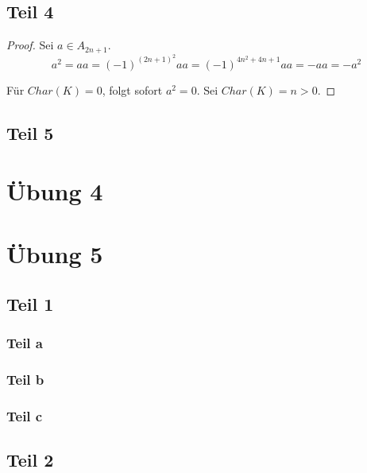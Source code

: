 \documentclass[10pt,a4paper]{article}
\begin{document}
\subsection*{Teil 4}

\begin{proof}
Sei $a \in A_{2n + 1}$.
\begin{equation}
a^{2} = aa = (-1)^{(2n + 1)^{2}} aa = (-1)^{4n^{2} + 4n + 1} aa = -aa = -a^{2}
\end{equation}

Für $Char(K) = 0$, folgt sofort $a^{2} = 0$.
Sei $Char(K) = n > 0$.
\end{proof}

\subsection*{Teil 5}

\section*{Übung 4}

\section*{Übung 5}

\subsection*{Teil 1}

\subsubsection*{Teil a}

\subsubsection*{Teil b}

\subsubsection*{Teil c}

\subsection*{Teil 2}
\end{document}

